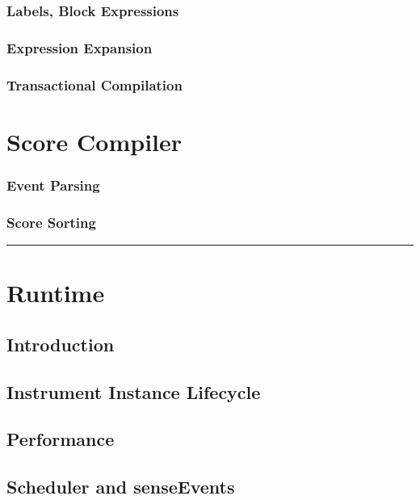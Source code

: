\documentclass[]{book}
\begin{document}
\subsection{Labels, Block Expressions}

\subsection{Expression Expansion}

\subsection{Transactional Compilation}


\chapter{Score Compiler}

\subsection{Event Parsing}

\subsection{Score Sorting}

\begin{center}\rule{3in}{0.4pt}\end{center}


\chapter{Runtime}

\section{Introduction}

\section{Instrument Instance Lifecycle}

\section{Performance}

\section{Scheduler and senseEvents}
\end{document}
